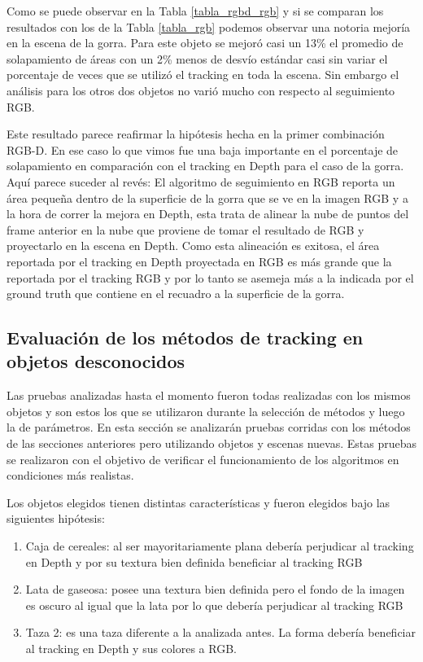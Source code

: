 Como se puede observar en la Tabla \ref{tabla_rgbd_rgb} y si se comparan los resultados con los de la Tabla \ref{tabla_rgb} podemos observar una notoria mejoría en la escena de la gorra. Para este objeto se mejoró casi un 13\% el promedio de solapamiento de áreas con un 2\% menos de desvío estándar casi sin variar el porcentaje de veces que se utilizó el tracking en toda la escena. Sin embargo el análisis para los otros dos objetos no varió mucho con respecto al seguimiento RGB.

Este resultado parece reafirmar la hipótesis hecha en la primer combinación RGB-D. En ese caso lo que vimos fue una baja importante en el porcentaje de solapamiento en comparación con el tracking en Depth para el caso de la gorra. Aquí parece suceder al revés: El algoritmo de seguimiento en RGB reporta un área pequeña dentro de la superficie de la gorra que se ve en la imagen RGB y a la hora de correr la mejora en Depth, esta trata de alinear la nube de puntos del frame anterior en la nube que proviene de tomar el resultado de RGB y proyectarlo en la escena en Depth. Como esta alineación es exitosa, el área reportada por el tracking en Depth proyectada en RGB es más grande que la reportada por el tracking RGB y por lo tanto se asemeja más a la indicada por el ground truth que contiene en el recuadro a la superficie de la gorra.




\subsection{Evaluación de los métodos de tracking en objetos desconocidos}

Las pruebas analizadas hasta el momento fueron todas realizadas con los mismos objetos y son estos los que se utilizaron durante la selección de métodos y luego la de parámetros. En esta sección se analizarán pruebas corridas con los métodos de las secciones anteriores pero utilizando objetos y escenas nuevas. Estas pruebas se realizaron con el objetivo de verificar el funcionamiento de los algoritmos en condiciones más realistas.

Los objetos elegidos tienen distintas características y fueron elegidos bajo las siguientes hipótesis:
\begin{enumerate}
	\item Caja de cereales: al ser mayoritariamente plana debería perjudicar al tracking en Depth y por su textura bien definida beneficiar al tracking RGB
	\item Lata de gaseosa: posee una textura bien definida pero el fondo de la imagen es oscuro al igual que la lata por lo que debería perjudicar al tracking RGB
	\item Taza 2: es una taza diferente a la analizada antes. La forma debería beneficiar al tracking en Depth y sus colores a RGB.
\end{enumerate}


